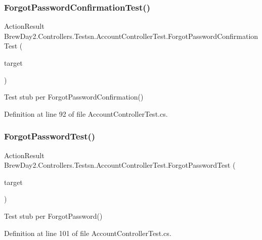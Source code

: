 \subsubsection{\texorpdfstring{Forgot\+Password\+Confirmation\+Test()}{ForgotPasswordConfirmationTest()}}
{\footnotesize\ttfamily Action\+Result Brew\+Day2.\+Controllers.\+Testsn.\+Account\+Controller\+Test.\+Forgot\+Password\+Confirmation\+Test (\begin{DoxyParamCaption}\item[{\mbox{[}\+Pex\+Assume\+Under\+Test\mbox{]} \mbox{\hyperlink{class_brew_day2_1_1_controllers_1_1_account_controller}{Account\+Controller}}}]{target }\end{DoxyParamCaption})}



Test stub per Forgot\+Password\+Confirmation()



Definition at line 92 of file Account\+Controller\+Test.\+cs.

\mbox{\label{class_brew_day2_1_1_controllers_1_1_testsn_1_1_account_controller_test_af65e3430fbf102940344739d7b4e7904}} 
\subsubsection{\texorpdfstring{Forgot\+Password\+Test()}{ForgotPasswordTest()}}
{\footnotesize\ttfamily Action\+Result Brew\+Day2.\+Controllers.\+Testsn.\+Account\+Controller\+Test.\+Forgot\+Password\+Test (\begin{DoxyParamCaption}\item[{\mbox{[}\+Pex\+Assume\+Under\+Test\mbox{]} \mbox{\hyperlink{class_brew_day2_1_1_controllers_1_1_account_controller}{Account\+Controller}}}]{target }\end{DoxyParamCaption})}



Test stub per Forgot\+Password()



Definition at line 101 of file Account\+Controller\+Test.\+cs.

